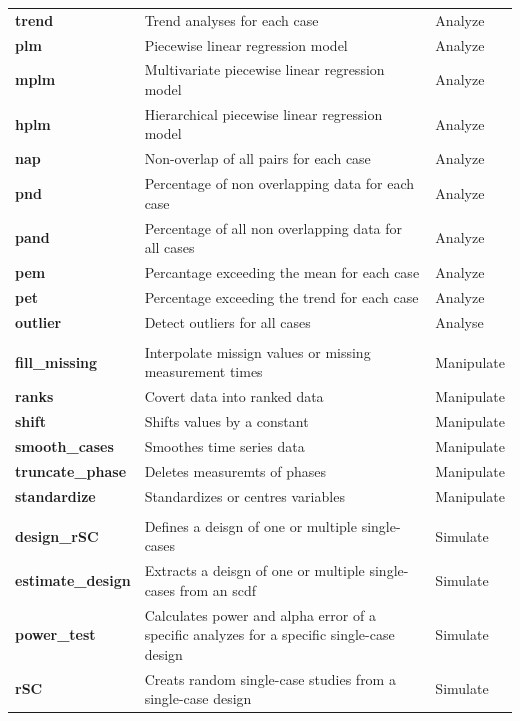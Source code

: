 \documentclass[
]{book}
\begin{document}
\begin{table}
\begin{tabular}[t]{>{\raggedright\arraybackslash}p{15em}>{\raggedright\arraybackslash}p{30em}l}
\textbf{trend} & Trend analyses for each case & Analyze\\
\textbf{plm} & Piecewise linear regression model & Analyze\\
\textbf{mplm} & Multivariate piecewise linear regression model & Analyze\\
\textbf{hplm} & Hierarchical piecewise linear regression model & Analyze\\
\addlinespace
\textbf{nap} & Non-overlap of all pairs for each case & Analyze\\
\textbf{pnd} & Percentage of non overlapping data for each case & Analyze\\
\textbf{pand} & Percentage of all non overlapping data for all cases & Analyze\\
\textbf{pem} & Percantage exceeding the mean for each case & Analyze\\
\textbf{pet} & Percentage exceeding the trend for each case & Analyze\\
\addlinespace
\textbf{outlier} & Detect outliers for all cases & Analyse\\
\textbf{} &  \vphantom{1} & \\
\textbf{fill\_missing} & Interpolate missign values or missing measurement times & Manipulate\\
\textbf{ranks} & Covert data into ranked data & Manipulate\\
\textbf{shift} & Shifts values by a constant & Manipulate\\
\addlinespace
\textbf{smooth\_cases} & Smoothes time series data & Manipulate\\
\textbf{truncate\_phase} & Deletes measuremts of phases & Manipulate\\
\textbf{standardize} & Standardizes or centres variables & Manipulate\\
\textbf{} &  & \\
\textbf{design\_rSC} & Defines a deisgn of one or multiple single-cases & Simulate\\
\addlinespace
\textbf{estimate\_design} & Extracts a deisgn of one or multiple single-cases from an scdf & Simulate\\
\textbf{power\_test} & Calculates power and alpha error of a specific analyzes for a specific single-case design & Simulate\\
\textbf{rSC} & Creats random single-case studies from a single-case design & Simulate\\
\bottomrule
\end{tabular}
\end{table}
\end{document}
